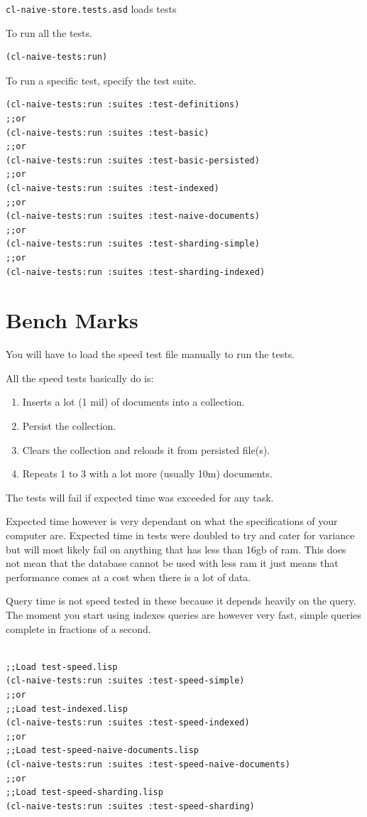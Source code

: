 \documentclass[11pt]{article}
\begin{document}
\texttt{cl-naive-store.tests.asd} loads tests

To run all the tests.

\begin{verbatim}
(cl-naive-tests:run)
\end{verbatim}

To run a specific test, specify the test suite.

\begin{verbatim}
(cl-naive-tests:run :suites :test-definitions)
;;or
(cl-naive-tests:run :suites :test-basic)
;;or
(cl-naive-tests:run :suites :test-basic-persisted)
;;or
(cl-naive-tests:run :suites :test-indexed)
;;or
(cl-naive-tests:run :suites :test-naive-documents)
;;or
(cl-naive-tests:run :suites :test-sharding-simple)
;;or
(cl-naive-tests:run :suites :test-sharding-indexed)
\end{verbatim}

\section{Bench Marks}
\label{sec:org482e698}

You will have to load the speed test file manually to run the tests.

All the speed tests basically do is:

\begin{enumerate}
\item Inserts a lot (1 mil) of documents into a collection.
\item Persist the collection.
\item Clears the collection and reloads it from persisted file(s).
\item Repeats 1 to 3 with a lot more (usually 10m) documents.
\end{enumerate}

The tests will fail if expected time was exceeded for any task.

Expected time however is very dependant on what the specifications of
your computer are. Expected time in tests were doubled to try and
cater for variance but will most likely fail on anything that has less
than 16gb of ram. This does not mean that the database cannot be used
with less ram it just means that performance comes at a cost when
there is a lot of data.

Query time is not speed tested in these because it depends heavily on
the query. The moment you start using indexes queries are however very
fast, simple queries complete in fractions of a second.


\begin{verbatim}

;;Load test-speed.lisp
(cl-naive-tests:run :suites :test-speed-simple)
;;or
;;Load test-indexed.lisp
(cl-naive-tests:run :suites :test-speed-indexed)
;;or
;;Load test-speed-naive-documents.lisp
(cl-naive-tests:run :suites :test-speed-naive-documents)
;;or
;;Load test-speed-sharding.lisp
(cl-naive-tests:run :suites :test-speed-sharding)

\end{verbatim}
\end{document}

